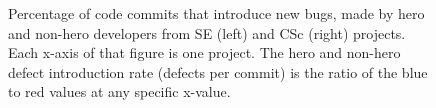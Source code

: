 \documentclass[conference,10pt]{IEEEtran}
\begin{document}
\begin{figure}[!t]
\vspace{-25pt}
 

\vspace{-10pt}
 \caption{Percentage of code commits that introduce new bugs, made by hero and non-hero developers from SE (left) and CSc (right) projects.
 Each x-axis of that figure is one project. The hero and non-hero defect introduction rate (defects per commit) is the ratio of the blue to red values
at any specific x-value. }\label{fig:heroes}
\vspace{-13pt}
\end{figure}
\end{document}
